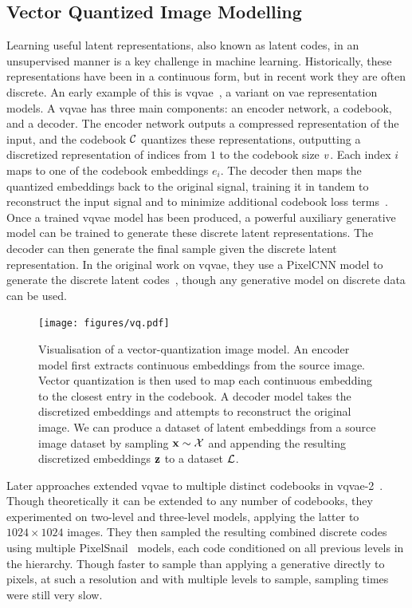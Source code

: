 \subsection{Vector Quantized Image Modelling}
\label{subsec:vqmodelling}

Learning useful latent representations, also known as latent codes, in an
unsupervised manner is a key challenge in machine learning. Historically, these
representations have been in a continuous form, but in recent work they are
often discrete. An early example of this is \gls{vqvae}~\cite{oord2017vqvae}, a
variant on \gls{vae} representation models. A \gls{vqvae} has three main
components: an encoder network, a codebook, and a decoder. The encoder network
outputs a compressed representation of the input, and the codebook
$\mathcal{C}$ quantizes these representations, outputting a discretized
representation of indices from $1$ to the codebook size $v$. Each
index $i$ maps to one of the codebook embeddings $e_i$. The decoder then maps
the quantized embeddings back to the original signal, training it in tandem to
reconstruct the input signal and to minimize additional codebook loss
terms~\cite{oord2017vqvae}. Once a trained \gls{vqvae} model has been produced,
a powerful auxiliary generative model can be trained to generate these discrete
latent representations. The decoder can then generate the final sample given the
discrete latent representation. In the original work on \gls{vqvae}, they use a
PixelCNN model to generate the discrete latent codes~\cite{oord2017vqvae},
though any generative model on discrete data can be used.

\begin{figure}[ht!]
    \centering
    \texttt{[image: figures/vq.pdf]}
    \caption{
        Visualisation of a vector-quantization image model. An encoder model
        first extracts continuous embeddings from the source image. Vector
        quantization is then used to map each continuous embedding to the
        closest entry in the codebook. A decoder model takes the discretized
        embeddings and attempts to reconstruct the original image. We can
        produce a dataset of latent embeddings from a source image dataset 
        by sampling $\mathbf{x} \sim \mathcal{X}$ and appending the resulting
        discretized embeddings $\mathbf{z}$ to a dataset $\mathcal{L}$.
    }
    \label{fig:vq}
\end{figure}

Later approaches extended \gls{vqvae} to multiple distinct codebooks in
\acrshort{vqvae}-2~\cite{razavi2019generating}. Though theoretically it can be
extended to any number of codebooks, they experimented on two-level and
three-level models, applying the latter to $1024 \times 1024$ images. They then
sampled the resulting combined discrete codes using multiple
PixelSnail~\cite{chen2017snail} models, each code conditioned on all previous
levels in the hierarchy. Though faster to sample than applying a generative
directly to pixels, at such a resolution and with multiple levels to sample,
sampling times were still very slow.

